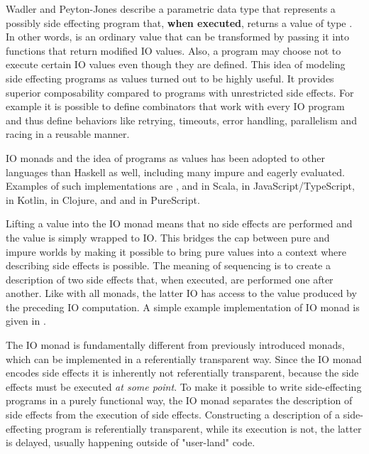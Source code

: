 Wadler and Peyton-Jones describe a parametric data type  that represents a possibly side effecting program that, \textbf{when executed}, returns a value of type . In other words,  is an ordinary value that can be transformed by passing it into functions that return modified IO values. Also, a program may choose not to execute certain IO values even though they are defined. This idea of modeling side effecting programs as values turned out to be highly useful. It provides superior composability compared to programs with unrestricted side effects. For example it is possible to define combinators that work with every IO program and thus define behaviors like retrying, timeouts, error handling, parallelism and racing in a reusable manner.

IO monads and the idea of programs as values has been adopted to other languages than Haskell as well, including many impure and eagerly evaluated. Examples of such implementations are ,  and  in Scala,  in JavaScript/TypeScript,  in Kotlin,  in Clojure, and  and  in PureScript.

Lifting a value into the IO monad means that no side effects are performed and the value is simply wrapped to IO. This bridges the cap between pure and impure worlds by making it possible to bring pure values into a context where describing side effects is possible.
The meaning of sequencing is to create a description of two side effects that, when executed, are performed one after another. Like with all monads, the latter IO has access to the value produced by the preceding IO computation. A simple example implementation of IO monad is given in .



The IO monad is fundamentally different from previously introduced monads, which can be implemented in a referentially transparent way. Since the IO monad encodes side effects it is inherently not referentially transparent, because the side effects must be executed \textit{at some point}. To make it possible to write side-effecting programs in a purely functional way, the IO monad separates the description of side effects from the execution of side effects. Constructing a description of a side-effecting program is referentially transparent, while its execution is not, the latter is delayed, usually happening outside of "user-land" code.

